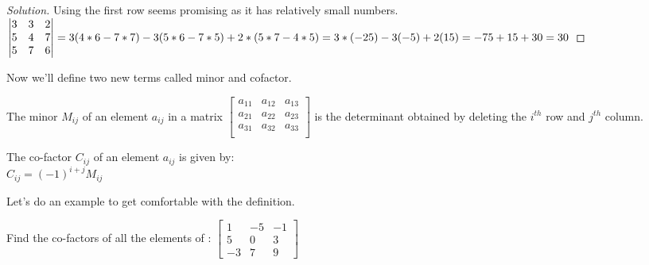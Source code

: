 \begin{proof}
    [Solution]
    Using the first row seems promising as it has relatively small numbers.\\
    $\begin{vmatrix}
    3 & 3 & 2 \\
    5 & 4 & 7 \\
    5 & 7 & 6 \\
\end{vmatrix} = 3(4*6-7*7)-3(5*6-7*5)+2*(5*7-4*5)\\
= 3*(-25)-3(-5)+2(15)\\
= -75+15+30\\
= 30$
\end{proof}
Now we'll define two new terms called minor and cofactor.\\
\begin{definition}
    The minor $M_{ij}$ of an element $a_{ij}$ in a matrix $\begin{bmatrix}
    a_{11} & a_{12} & a_{13} \\
    a_{21} & a_{22} & a_{23} \\
    a_{31} & a_{32} & a_{33} \\
\end{bmatrix}$ is the determinant obtained by deleting the $i^{th}$ row and $j^{th}$ column.\\
\end{definition}
\begin{definition}
    The co-factor $C_{ij}$ of an element $a_{ij}$ is given by:\\
    $C_{ij}=(-1)^{i+j}M_{ij}$
\end{definition}
Let's do an example to get comfortable with the definition.\\
\begin{example}
    Find the co-factors of all the elements of : $\begin{bmatrix}
        1 &-5 & -1\\
        5 &0 &3\\
        -3 &7 &9
    \end{bmatrix}$ 
\end{example}
